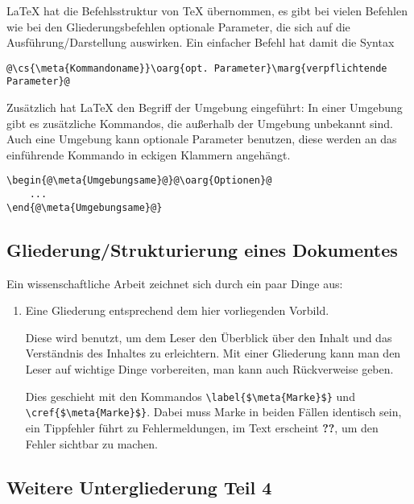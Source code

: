 \documentclass[ngerman,               %
               a4paper,               %
               fleqn,                 %
                     ]{scrartcl}       %
\begin{document}
\LaTeX{} hat die Befehlsstruktur von \TeX{} übernommen, es gibt bei vielen
Befehlen wie bei den Gliederungsbefehlen optionale Parameter, die sich auf
die Ausführung/Darstellung auswirken. Ein einfacher Befehl hat damit die
Syntax
\begin{lstlisting}[style=colored]
@\cs{\meta{Kommandoname}}\oarg{opt. Parameter}\marg{verpflichtende Parameter}@
\end{lstlisting}

Zusätzlich hat \LaTeX{} den Begriff der Umgebung eingeführt: In einer
Umgebung gibt es zusätzliche Kommandos, die außerhalb der Umgebung
unbekannt sind. Auch eine Umgebung kann optionale Parameter benutzen, diese
werden an das einführende Kommando in eckigen Klammern angehängt.
\begin{lstlisting}
\begin{@\meta{Umgebungsame}@}@\oarg{Optionen}@
    ...
\end{@\meta{Umgebungsame}@}
\end{lstlisting}


\subsection{Gliederung/Strukturierung eines Dokumentes}

Ein wissenschaftliche Arbeit zeichnet sich durch ein paar Dinge aus:
\begin{enumerate}
  \item Eine Gliederung entsprechend dem hier vorliegenden Vorbild.

    Diese wird benutzt, um dem Leser den Überblick über den Inhalt und
    das Verständnis des Inhaltes zu erleichtern. Mit einer Gliederung
    kann man den Leser auf wichtige Dinge vorbereiten, man kann auch
    Rückverweise geben.

    Dies geschieht mit den Kommandos
    \lstinline[mathescape]|\label{$\meta{Marke}$}| und
    \lstinline[mathescape]|\cref{$\meta{Marke}$}|. Dabei muss Marke in
    beiden Fällen identisch sein, ein Tippfehler führt zu
    Fehlermeldungen, im Text erscheint \textbf{??}, um den Fehler
    sichtbar zu machen.

\end{enumerate}



\subsection{Weitere Untergliederung Teil 4}
\end{document}
